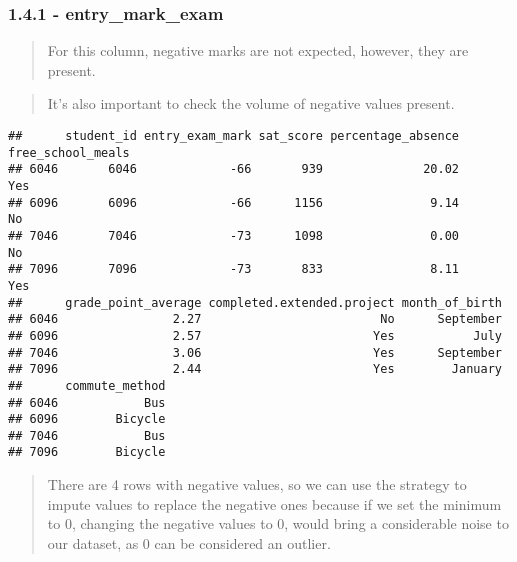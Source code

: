 \documentclass[
]{article}
\newenvironment{Shaded}{\begin{snugshade}}{\end{snugshade}}
\newcommand{\DecValTok}[1]{\textcolor[rgb]{0.00,0.00,0.81}{#1}}
\newcommand{\NormalTok}[1]{#1}
\newcommand{\OtherTok}[1]{\textcolor[rgb]{0.56,0.35,0.01}{#1}}
\newcommand{\SpecialCharTok}[1]{\textcolor[rgb]{0.81,0.36,0.00}{\textbf{#1}}}
\begin{document}
\subsubsection{1.4.1 - entry\_mark\_exam}\label{entry_mark_exam}

\begin{quote}
For this column, negative marks are not expected, however, they are
present.
\end{quote}

\begin{quote}
It's also important to check the volume of negative values present.
\end{quote}

\begin{Shaded}
\end{Shaded}

\begin{verbatim}
##      student_id entry_exam_mark sat_score percentage_absence free_school_meals
## 6046       6046             -66       939              20.02               Yes
## 6096       6096             -66      1156               9.14                No
## 7046       7046             -73      1098               0.00                No
## 7096       7096             -73       833               8.11               Yes
##      grade_point_average completed.extended.project month_of_birth
## 6046                2.27                         No      September
## 6096                2.57                        Yes           July
## 7046                3.06                        Yes      September
## 7096                2.44                        Yes        January
##      commute_method
## 6046            Bus
## 6096        Bicycle
## 7046            Bus
## 7096        Bicycle
\end{verbatim}

\begin{quote}
There are 4 rows with negative values, so we can use the strategy to
impute values to replace the negative ones because if we set the minimum
to 0, changing the negative values to 0, would bring a considerable
noise to our dataset, as 0 can be considered an outlier.
\end{quote}
\end{document}

